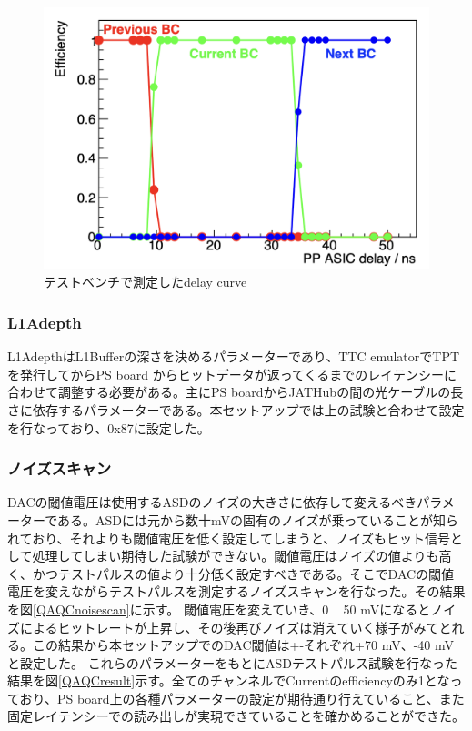 \begin{figure} 
\centering
\includegraphics[width=16cm]{fig/QAQCdelayscan.png}
\caption[ディレイカーブ]{テストベンチで測定したdelay curve}
\label{QAQCdelayscan}
\end{figure}

\subsubsection{L1Adepth}
L1AdepthはL1Bufferの深さを決めるパラメーターであり、TTC emulatorでTPTを発行してからPS board からヒットデータが返ってくるまでのレイテンシーに合わせて調整する必要がある。主にPS boardからJATHubの間の光ケーブルの長さに依存するパラメーターである。本セットアップでは上の試験と合わせて設定を行なっており、0x87に設定した。
\baselineskip

\subsubsection{ノイズスキャン}
DACの閾値電圧は使用するASDのノイズの大きさに依存して変えるべきパラメーターである。ASDには元から数十mVの固有のノイズが乗っていることが知られており、それよりも閾値電圧を低く設定してしまうと、ノイズもヒット信号として処理してしまい期待した試験ができない。閾値電圧はノイズの値よりも高く、かつテストパルスの値より十分低く設定すべきである。そこでDACの閾値電圧を変えながらテストパルスを測定するノイズスキャンを行なった。その結果を図\ref{QAQCnoisescan}に示す。
閾値電圧を変えていき、0 ~ 50 mVになるとノイズによるヒットレートが上昇し、その後再びノイズは消えていく様子がみてとれる。この結果から本セットアップでのDAC閾値は+-それぞれ+70 mV、-40 mVと設定した。
これらのパラメーターをもとにASDテストパルス試験を行なった結果を図\ref{QAQCresult}示す。全てのチャンネルでCurrentのefficiencyのみ1となっており、PS board上の各種パラメーターの設定が期待通り行えていること、また固定レイテンシーでの読み出しが実現できていることを確かめることができた。
\baselineskip

